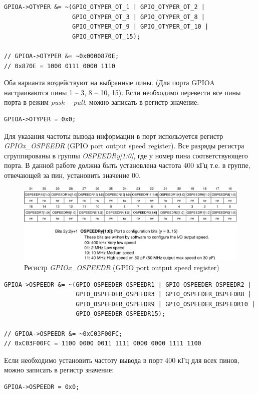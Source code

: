 \begin{verbatim}
GPIOA->OTYPER &= ~(GPIO_OTYPER_OT_1 | GPIO_OTYPER_OT_2 |
                   GPIO_OTYPER_OT_3 | GPIO_OTYPER_OT_8 | 
                   GPIO_OTYPER_OT_9 | GPIO_OTYPER_OT_10 |
                   GPIO_OTYPER_OT_15);

// GPIOA->OTYPER &= ~0x0000870E;
// 0x870E = 1000 0111 0000 1110 
\end{verbatim}

Оба варианта воздействуют на выбранные пины. (Для порта GPIOA настраиваются пины 1 -- 3, 8 -- 10, 15). Если необходимо перевести все пины порта в режим \textit{push -- pull}, можно записать в регистр значение:

\begin{verbatim}
GPIOA->OTYPER = 0x0;
\end{verbatim}


Для указания частоты вывода информации в порт используется регистр \textit{ GPIOx\_OSPEEDR} (GPIO port output speed register). Все разряды регистра сгруппированы в группы \textit{OSPEEDRy[1:0]}, где y номер пина соответствующего порта. В данной работе должна быть установлена частота 400 кГц т.е. в группе, отвечающей за пин, установить значение 00. 


\begin{figure}[H]
\begin{center}
\includegraphics[scale=0.25]{Image/41.jpg} 
\end{center}
\caption{Регистр \textit{ GPIOx\_OSPEEDR} (GPIO port output speed register)}
\end{figure}

\begin{verbatim}
GPIOA->OSPEEDR &= ~(GPIO_OSPEEDER_OSPEEDR1 | GPIO_OSPEEDER_OSPEEDR2 |
                    GPIO_OSPEEDER_OSPEEDR3 | GPIO_OSPEEDER_OSPEEDR8 | 
                    GPIO_OSPEEDER_OSPEEDR9 | GPIO_OSPEEDER_OSPEEDR10 | 
                    GPIO_OSPEEDER_OSPEEDR15);

// GPIOA->OSPEEDR &= ~0xC03F00FC;
// 0xC03F00FC = 1100 0000 0011 1111 0000 0000 1111 1100 
\end{verbatim}
Если необходимо установить частоту вывода в порт 400 кГц для всех пинов, можно записать в регистр значение:
\begin{verbatim}
GPIOA->OSPEEDR = 0x0;
\end{verbatim}

